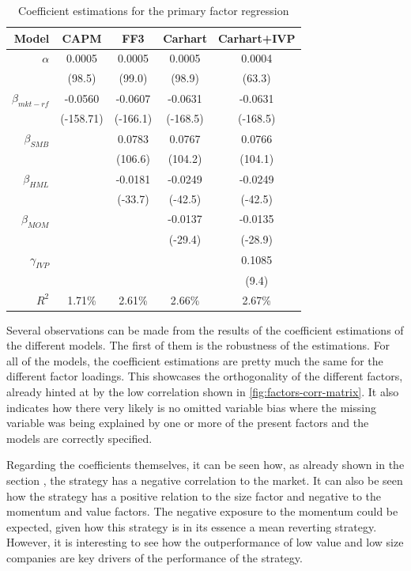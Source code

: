 \begin{table}[ht]
    \centering
    \begin{tabular}{rcccc}
        \toprule
        Model & CAPM & FF3 & Carhart & Carhart+IVP \\ 
        \midrule
        $\alpha$ & 0.0005 & 0.0005 & 0.0005 & 0.0004 \\
                 & (98.5) & (99.0) & (98.9) & (63.3) \\[8px]
        $\beta_{mkt-rf}$ & -0.0560 & -0.0607 & -0.0631 & -0.0631 \\
                         & (-158.71) & (-166.1) & (-168.5) & (-168.5) \\[8px]
        $\beta_{SMB}$ & & 0.0783 & 0.0767 & 0.0766 \\
                      & & (106.6) & (104.2) & (104.1) \\[8px]
        $\beta_{HML}$ & & -0.0181 & -0.0249 & -0.0249 \\
                      & & (-33.7) & (-42.5) & (-42.5) \\[8px]
        $\beta_{MOM}$ & & & -0.0137 & -0.0135 \\
                      & & & (-29.4) & (-28.9) \\[8px]
        $\gamma_{IVP}$ & & & & 0.1085 \\
                       & & & & (9.4) \\[8px]
        \midrule
        $R^2$ & 1.71\% & 2.61\% & 2.66\% & 2.67\% \\

        \bottomrule
    \end{tabular}
    \caption{Coefficient estimations for the primary factor regression}
    \label{table:primary-regression-results}
\end{table}

Several observations can be made from the results of the coefficient estimations of the different models. The first of them is the robustness of the estimations. For all of the models, the coefficient estimations are pretty much the same for the different factor loadings. This showcases the orthogonality of the different factors, already hinted at by the low correlation shown in \autoref{fig:factors-corr-matrix}. It also indicates how there very likely is no omitted variable bias where the missing variable was being explained by one or more of the present factors and the models are correctly specified.

Regarding the coefficients themselves, it can be seen how, as already shown in the section , the strategy has a negative correlation to the market. It can also be seen how the strategy has a positive relation to the size factor and negative to the momentum and value factors. The negative exposure to the momentum could be expected, given how this strategy is in its essence a mean reverting strategy. However, it is interesting to see how the outperformance of low value and low size companies are key drivers of the performance of the strategy. 


